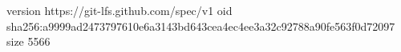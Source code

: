 version https://git-lfs.github.com/spec/v1
oid sha256:a9999ad2473797610e6a3143bd643cea4ec4ee3a32c92788a90fe563f0d72097
size 5566
